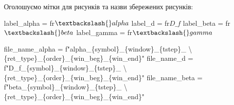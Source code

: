 \documentclass[
  letterpaper,
]{report}
\newenvironment{Shaded}{\begin{snugshade}}{\end{snugshade}}
\newcommand{\CharTok}[1]{\textcolor[rgb]{0.13,0.47,0.30}{#1}}
\newcommand{\NormalTok}[1]{\textcolor[rgb]{0.00,0.23,0.31}{#1}}
\newcommand{\OperatorTok}[1]{\textcolor[rgb]{0.37,0.37,0.37}{#1}}
\newcommand{\SpecialCharTok}[1]{\textcolor[rgb]{0.37,0.37,0.37}{#1}}
\newcommand{\SpecialStringTok}[1]{\textcolor[rgb]{0.13,0.47,0.30}{#1}}
\newcommand{\VerbatimStringTok}[1]{\textcolor[rgb]{0.13,0.47,0.30}{#1}}
\begin{document}
Оголошуємо мітки для рисунків та назви збережених рисунків:

\begin{Shaded}
\begin{Highlighting}[]
\NormalTok{label\_alpha }\OperatorTok{=} \VerbatimStringTok{fr\textquotesingle{}$\textbackslash{}alpha$\textquotesingle{}}
\NormalTok{label\_d }\OperatorTok{=} \VerbatimStringTok{fr\textquotesingle{}$D\_f$\textquotesingle{}}
\NormalTok{label\_beta }\OperatorTok{=} \VerbatimStringTok{fr\textquotesingle{}$\textbackslash{}beta$\textquotesingle{}}
\NormalTok{label\_gamma }\OperatorTok{=} \VerbatimStringTok{fr\textquotesingle{}$\textbackslash{}gamma$\textquotesingle{}}

\NormalTok{file\_name\_alpha }\OperatorTok{=} \SpecialStringTok{f"alpha\_}\SpecialCharTok{\{}\NormalTok{symbol}\SpecialCharTok{\}}\SpecialStringTok{\_}\SpecialCharTok{\{}\NormalTok{window}\SpecialCharTok{\}}\SpecialStringTok{\_}\SpecialCharTok{\{}\NormalTok{tstep}\SpecialCharTok{\}}\SpecialStringTok{\_ }\CharTok{\textbackslash{}}
\SpecialStringTok{            }\SpecialCharTok{\{}\NormalTok{ret\_type}\SpecialCharTok{\}}\SpecialStringTok{\_}\SpecialCharTok{\{}\NormalTok{order}\SpecialCharTok{\}}\SpecialStringTok{\_}\SpecialCharTok{\{}\NormalTok{win\_beg}\SpecialCharTok{\}}\SpecialStringTok{\_}\SpecialCharTok{\{}\NormalTok{win\_end}\SpecialCharTok{\}}\SpecialStringTok{"}
\NormalTok{file\_name\_d }\OperatorTok{=} \SpecialStringTok{f"D\_f\_}\SpecialCharTok{\{}\NormalTok{symbol}\SpecialCharTok{\}}\SpecialStringTok{\_}\SpecialCharTok{\{}\NormalTok{window}\SpecialCharTok{\}}\SpecialStringTok{\_}\SpecialCharTok{\{}\NormalTok{tstep}\SpecialCharTok{\}}\SpecialStringTok{\_ }\CharTok{\textbackslash{}}
\SpecialStringTok{            }\SpecialCharTok{\{}\NormalTok{ret\_type}\SpecialCharTok{\}}\SpecialStringTok{\_}\SpecialCharTok{\{}\NormalTok{order}\SpecialCharTok{\}}\SpecialStringTok{\_}\SpecialCharTok{\{}\NormalTok{win\_beg}\SpecialCharTok{\}}\SpecialStringTok{\_}\SpecialCharTok{\{}\NormalTok{win\_end}\SpecialCharTok{\}}\SpecialStringTok{"}
\NormalTok{file\_name\_beta }\OperatorTok{=} \SpecialStringTok{f"beta\_}\SpecialCharTok{\{}\NormalTok{symbol}\SpecialCharTok{\}}\SpecialStringTok{\_}\SpecialCharTok{\{}\NormalTok{window}\SpecialCharTok{\}}\SpecialStringTok{\_}\SpecialCharTok{\{}\NormalTok{tstep}\SpecialCharTok{\}}\SpecialStringTok{\_ }\CharTok{\textbackslash{}}
\SpecialStringTok{            }\SpecialCharTok{\{}\NormalTok{ret\_type}\SpecialCharTok{\}}\SpecialStringTok{\_}\SpecialCharTok{\{}\NormalTok{order}\SpecialCharTok{\}}\SpecialStringTok{\_}\SpecialCharTok{\{}\NormalTok{win\_beg}\SpecialCharTok{\}}\SpecialStringTok{\_}\SpecialCharTok{\{}\NormalTok{win\_end}\SpecialCharTok{\}}\SpecialStringTok{"}

\end{Highlighting}
\end{Shaded}
\end{document}
